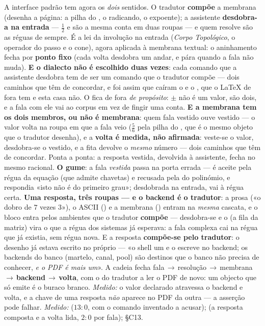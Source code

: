 \documentclass[livro.tex]{subfiles}
\begin{document}
\begin{observacao}
\label{obs:membrana-entrada}
A interface padrão tem agora os \emph{dois} sentidos. O tradutor \textbf{compõe} a
membrana (desenha a página: a pilha do , o radicando, o
expoente); a assistente \textbf{desdobra-a na entrada} --- $\frac{1}{2}$ e
 são a mesma conta em duas roupas --- e quem resolve são as réguas de
sempre. É a lei da involução na entrada (\emph{Corpo Topológico}, o operador do passo e o cone),
agora aplicada à membrana textual: o aninhamento fecha por \textbf{ponto fixo} (cada
volta desdobra um andar, e pára quando a fala não muda).
\textbf{E o dialecto não é escolhido duas vezes}: cada comando que a assistente
desdobra tem de ser um comando que o tradutor compõe --- dois caminhos que têm de
concordar, e foi assim que caíram o  e o ,
que o \LaTeX{} de fora tem e esta casa não. O  fica de fora
\emph{de propósito}: $\pm$ não é um valor, são dois, e a fala com ele vai ao corpus em
vez de fingir uma conta.
\textbf{E a membrana tem os dois membros, ou não é membrana}: quem fala vestido ouve
vestido --- o valor volta na roupa em que a fala veio ($\frac{5}{6}$ pela pilha do
, que é o mesmo objeto que o tradutor desenha), e a
\textbf{volta é medida, não afirmada}: veste-se o valor, desdobra-se o vestido, e a
fita devolve o \emph{mesmo} número --- dois caminhos que têm de concordar. Ponta a
ponta: a resposta vestida, devolvida à assistente, fecha no mesmo racional.
\textbf{O gume}: a fala \emph{vestida} passa na porta errada --- 
é aceite pela régua da equação (que admite chavetas) e recusada pela do polinómio, e
respondia «isto não é do primeiro grau»; desdobrada na entrada, vai à régua certa.
\textbf{Uma resposta, três roupas --- e o backend é o tradutor}: a prosa («o dobro de
$7$ vezes $3$»), o ASCII () e a membrana
() entram na \emph{mesma} cascata, e o bloco entra
pelos ambientes que o tradutor \textbf{compõe} ---  desdobra-se e o
\code{$\backslash\backslash$} (a fila da matriz) vira o \code{;} que a régua dos
sistemas já esperava: a fala complexa cai na régua que já existia, sem régua nova. E a
resposta \textbf{compõe-se pelo tradutor}: o desenho já estava escrito no próprio
 --- «o shell  um  e o  escreve no
backend; os backends do banco (martelo, canal, pool) são destinos que o banco não
precisa de conhecer, \emph{e o PDF é mais um}». A cadeia fecha
fala\,$\to$\,resolução\,$\to$\,membrana\,$\to$\,\textbf{backend}\,$\to$\,\textbf{volta},
com o  do tradutor a ler o PDF de novo: um objecto que só emite é o buraco
branco. \emph{Medido:} o valor declarado atravessa o backend e volta, e a chave de uma
resposta \emph{não} aparece no PDF da outra --- a asserção pode falhar.
\emph{Medido:}  ($13{:}0$, com o comando inventado a
acusar);  (a resposta composta e a volta lida, $2{:}0$ por fala);
 \S C13.
\end{observacao}
\end{document}
